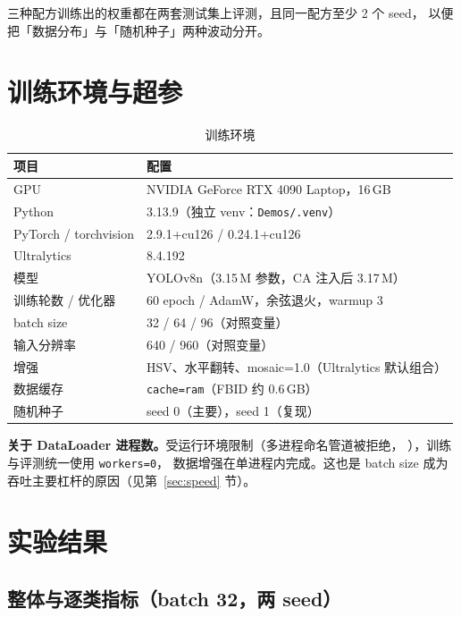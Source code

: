 \documentclass[UTF8,a4paper,11pt]{ctexart}
\begin{document}
三种配方训练出的权重都在两套测试集上评测，且同一配方至少 2 个 seed，
以便把「数据分布」与「随机种子」两种波动分开。

\section{训练环境与超参}

\begin{table}[htbp]
\centering
\caption{训练环境}
\begin{tabular}{ll}
\toprule
项目 & 配置 \\
\midrule
GPU & NVIDIA GeForce RTX 4090 Laptop，16\,GB \\
Python & 3.13.9（独立 venv：\texttt{Demos/.venv}） \\
PyTorch / torchvision & 2.9.1+cu126 / 0.24.1+cu126 \\
Ultralytics & 8.4.192 \\
模型 & YOLOv8n（3.15\,M 参数，CA 注入后 3.17\,M） \\
训练轮数 / 优化器 & 60 epoch / AdamW，余弦退火，warmup 3 \\
batch size & 32 / 64 / 96（对照变量） \\
输入分辨率 & 640 / 960（对照变量） \\
增强 & HSV、水平翻转、mosaic=1.0（Ultralytics 默认组合） \\
数据缓存 & \texttt{cache=ram}（FBID 约 0.6\,GB） \\
随机种子 & seed 0（主要），seed 1（复现） \\
\bottomrule
\end{tabular}
\end{table}

\noindent\textbf{关于 DataLoader 进程数。}受运行环境限制（多进程命名管道被拒绝，
），训练与评测统一使用 \texttt{workers=0}，
数据增强在单进程内完成。这也是 batch size 成为吞吐主要杠杆的原因（见第~\ref{sec:speed} 节）。

\section{实验结果}

\subsection{整体与逐类指标（batch 32，两 seed）}
\end{document}
